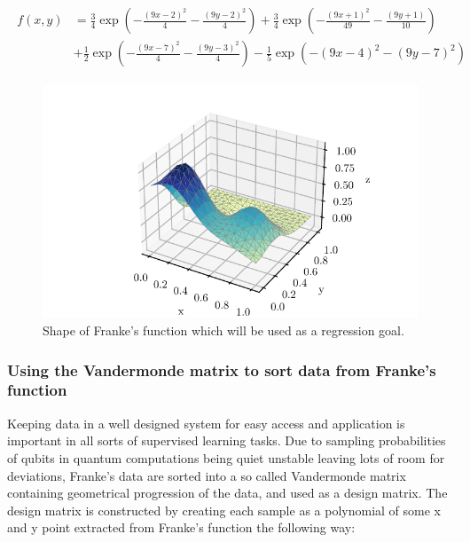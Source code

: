 \documentclass[../main.tex]{subfiles}
\begin{document}
\begin{align*}
\begin{split}
  f(x,y) &= \frac{3}{4}\exp{\left(-\frac{(9x-2)^2}{4} - \frac{(9y-2)^2}{4}\right)}+\frac{3}{4}\exp{\left(-\frac{(9x+1)^2}{49}- \frac{(9y+1)}{10}\right)} \\
  &+\frac{1}{2}\exp{\left(-\frac{(9x-7)^2}{4} - \frac{(9y-3)^2}{4}\right)} -\frac{1}{5}\exp{\left(-(9x-4)^2 - (9y-7)^2\right)}
\end{split}
  \label{eq:franke-func}
\end{align*}

\begin{figure}[ht]
    \begin{center}
        \includegraphics{figures/real_franke.pdf}
        \caption{Shape of Franke's function which will be used as a regression goal.}
        \label{fig:frankesplot}
    \end{center}
\end{figure}

\subsubsection{Using the Vandermonde matrix to sort data from Franke's function}
Keeping data in a well designed system for easy access and application is important in all sorts of supervised learning tasks. Due to sampling probabilities of qubits in quantum computations being quiet unstable leaving lots of room for deviations, Franke's data are sorted into a so called Vandermonde matrix containing geometrical progression of the data, and used as a design matrix. The design matrix is constructed by creating each sample as a polynomial of some x and y point extracted from Franke's function the following way:
\end{document}
